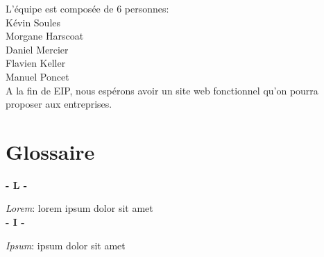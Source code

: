 L’équipe est composée de 6 personnes:\\
Kévin Soules\\
Morgane Harscoat\\
Daniel Mercier\\
Flavien Keller\\
Manuel Poncet\\

A la fin de EIP, nous espérons avoir un site web fonctionnel qu’on pourra proposer aux entreprises.

\section{Glossaire}
\noindent

\vskip 0.1cm
\textbf{- L -}\\
\vskip 0.1cm

\textit{Lorem}: lorem ipsum dolor sit amet\\

\vskip 0.1cm
\textbf{- I -}\\
\vskip 0.1cm

\textit{Ipsum}: ipsum dolor sit amet\\

